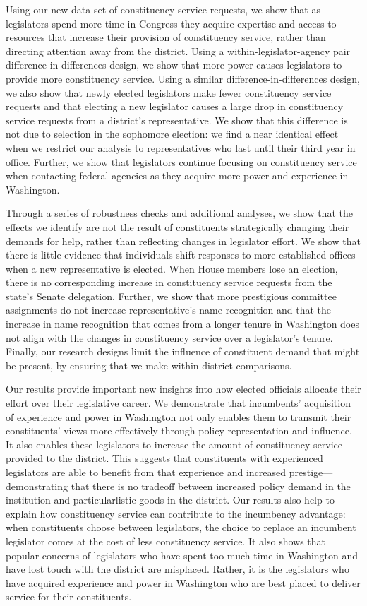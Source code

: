 \documentclass[12pt]{article}
\begin{document}
Using our new data set of constituency service requests, we show that as legislators spend more time in Congress they acquire expertise and access to resources that increase their provision of constituency service, rather than directing attention away from the district.  Using a within-legislator-agency pair difference-in-differences design, we show that more power causes legislators to provide more constituency service.  Using a similar difference-in-differences design, we also show that newly elected legislators make fewer constituency service requests and that electing a new legislator causes a large drop in constituency service requests from a district's representative.  We show that this difference is not due to selection in the sophomore election: we find a near identical effect when we restrict our analysis to representatives who last until their third year in office.  Further, we show that legislators continue focusing on constituency service when contacting federal agencies as they acquire more power and experience in Washington.  

Through a series of robustness checks and additional analyses, we show that the effects we identify are not the result of constituents strategically changing their demands for help, rather than reflecting changes in legislator effort.  We show that there is little evidence that individuals shift responses to more established offices when a new representative is elected.  When House members lose an election, there is no corresponding increase in constituency service requests from the state's Senate delegation.  Further, we show that more prestigious committee assignments do not increase representative's name recognition and that the increase in name recognition that comes from a longer tenure in Washington does not align with the changes in constituency service over a legislator's tenure.  Finally, our research designs limit the influence of constituent demand that might be present, by ensuring that we make within district comparisons.  

Our results provide important new insights into how elected officials allocate their effort over their legislative career.  We demonstrate that incumbents' acquisition of experience and power in Washington not only enables them to transmit their constituents' views more effectively through policy representation and influence.  It also enables these legislators to increase the amount of constituency service provided to the district.  This suggests that constituents with experienced legislators are able to benefit from that experience and increased prestige---demonstrating that there is no tradeoff between increased policy demand in the institution and particularlistic goods in the district.  Our results also help to explain how constituency service can contribute to the incumbency advantage: when constituents choose between legislators, the choice to replace an incumbent legislator comes at the cost of less constituency service. It also shows that popular concerns of legislators who have spent too much time in Washington and have lost touch with the district are misplaced.  Rather, it is the legislators who have acquired experience and power in Washington who are best placed to deliver service for their constituents.    
\end{document}

